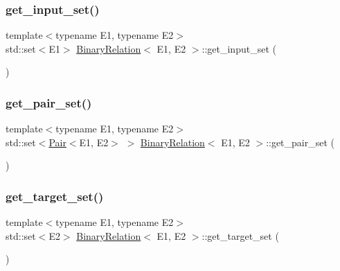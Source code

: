 \subsubsection{\texorpdfstring{get\+\_\+input\+\_\+set()}{get\_input\_set()}}
{\footnotesize\ttfamily template$<$typename E1, typename E2$>$ \\
std\+::set$<$E1$>$ \hyperlink{classBinaryRelation}{Binary\+Relation}$<$ E1, E2 $>$\+::get\+\_\+input\+\_\+set (\begin{DoxyParamCaption}{ }\end{DoxyParamCaption})\hspace{0.3cm}{\ttfamily [inline]}}

\mbox{\label{classBinaryRelation_acd26705b6496d2db082489df739485f2}} 
\subsubsection{\texorpdfstring{get\+\_\+pair\+\_\+set()}{get\_pair\_set()}}
{\footnotesize\ttfamily template$<$typename E1, typename E2$>$ \\
std\+::set$<$\hyperlink{classPair}{Pair}$<$E1, E2$>$ $>$ \hyperlink{classBinaryRelation}{Binary\+Relation}$<$ E1, E2 $>$\+::get\+\_\+pair\+\_\+set (\begin{DoxyParamCaption}{ }\end{DoxyParamCaption})\hspace{0.3cm}{\ttfamily [inline]}}

\mbox{\label{classBinaryRelation_a97083c4e6c05cd1838f265819b608263}} 
\subsubsection{\texorpdfstring{get\+\_\+target\+\_\+set()}{get\_target\_set()}}
{\footnotesize\ttfamily template$<$typename E1, typename E2$>$ \\
std\+::set$<$E2$>$ \hyperlink{classBinaryRelation}{Binary\+Relation}$<$ E1, E2 $>$\+::get\+\_\+target\+\_\+set (\begin{DoxyParamCaption}{ }\end{DoxyParamCaption})\hspace{0.3cm}{\ttfamily [inline]}}

